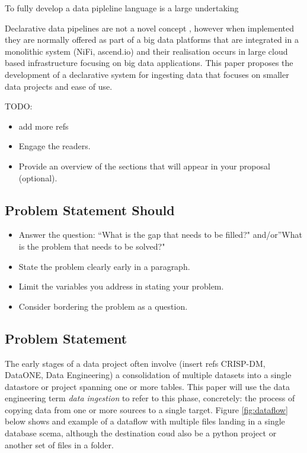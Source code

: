 To fully develop a data pipleline language is a large undertaking

Declarative data pipelines are not a novel concept \citep{ingestbase},
however when implemented they are normally offered as part of a big data
platforms that are integrated in a monolithic system (NiFi, ascend.io)
and their realisation occurs in large cloud based infrastructure
focusing on big data applications. This paper proposes the development
of a declarative system for ingesting data that focuses on smaller data
projects and ease of use.

TODO:

\begin{itemize}
\tightlist
\item
  add more refs
\item
  Engage the readers.
\item
  Provide an overview of the sections that will appear in your proposal
  (optional).
\end{itemize}

\subsection{Problem Statement Should}\label{problem-statement-should}

\begin{itemize}
\item
  Answer the question: ``What is the gap that needs to be filled?"
  and/or''What is the problem that needs to be solved?"
\item
  State the problem clearly early in a paragraph.
\item
  Limit the variables you address in stating your problem.
\item
  Consider bordering the problem as a question.
\end{itemize}

\subsection{Problem Statement}\label{problem-statement}

The early stages of a data project often involve (insert refs CRISP-DM,
DataONE, Data Engineering) a consolidation of multiple datasets into a
single datastore or project spanning one or more tables. This paper will
use the data engineering term \emph{data ingestion} to refer to this
phase, concretely: the process of copying data from one or more sources
to a single target. Figure \ref{fig:dataflow} below shows and example of
a dataflow with multiple files landing in a single database scema,
although the destination coud also be a python project or another set of
files in a folder.


